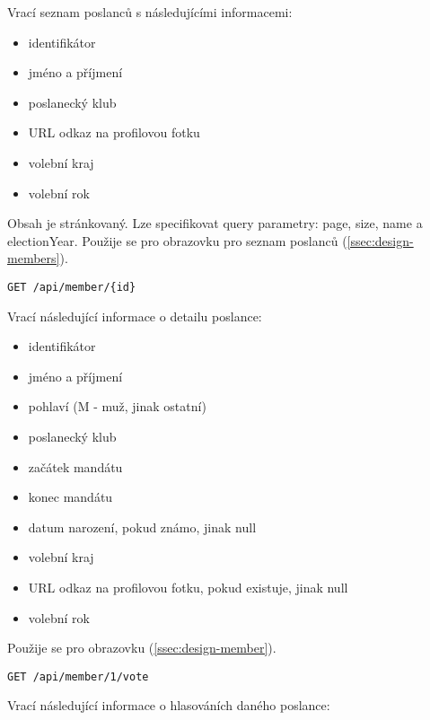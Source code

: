\noindent Vrací seznam poslanců s následujícími informacemi:

\begin{itemize}
	\item identifikátor
	\item jméno a příjmení
	\item poslanecký klub
	\item URL odkaz na profilovou fotku
	\item volební kraj
	\item volební rok
\end{itemize}

\noindent Obsah je stránkovaný. Lze specifikovat query parametry: page, size, name a electionYear. Použije se pro obrazovku pro seznam poslanců (\ref{ssec:design-members}).

\vspace{10px}

\begin{lstlisting}[label={lst:endpoint-member}] 
GET /api/member/{id}
\end{lstlisting}

\noindent Vrací následující informace o detailu poslance:

\begin{itemize}
	\item identifikátor
	\item jméno a příjmení
	\item pohlaví (M - muž, jinak ostatní)
	\item poslanecký klub
	\item začátek mandátu
	\item konec mandátu
	\item datum narození, pokud známo, jinak null
	\item volební kraj
	\item URL odkaz na profilovou fotku, pokud existuje, jinak null
	\item volební rok
\end{itemize}

\noindent Použije se pro obrazovku (\ref{ssec:design-member}).

\vspace{10px}

\begin{lstlisting}[label={lst:endpoint-member-votes}] 
GET /api/member/1/vote
\end{lstlisting}

\noindent Vrací následující informace o hlasováních daného poslance:

